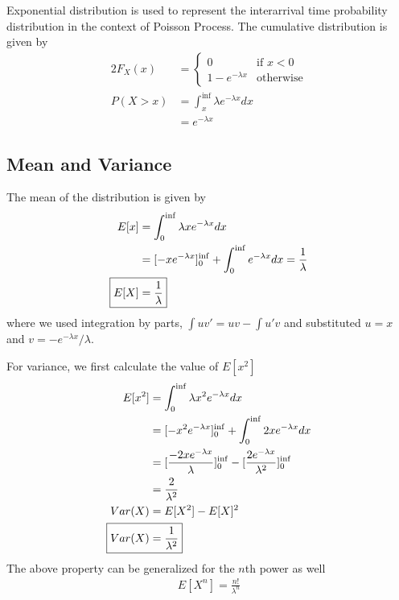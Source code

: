 \documentclass[11pt, a4paper]{article}
\begin{document}
    Exponential distribution is used to represent the interarrival time probability distribution in the context of Poisson Process. The cumulative distribution is given by
    \begin{alignat*}{2}
        F_{X}(x) &= \begin{cases} 0 &\mbox{if $x < 0$}\\
                                1 - e^{-\lambda x} &\mbox{otherwise} \end{cases}\\
        P(X > x) &= \int_{x}^{\inf} \lambda e^{-\lambda x} dx\\
        &= e^{-\lambda x}
    \end{alignat*}

    \subsection{Mean and Variance}
    The mean of the distribution is given by
    \begin{align*}
        E[x] &= \int_{0}^{\inf} \lambda x e^{-\lambda x} dx\\
        &= [-x e^{-\lambda x}]_{0}^{\inf} + \int_{0}^{\inf} e^{-\lambda x} dx = \frac{1}{\lambda}\\
        \Aboxed{E[X] &= \frac{1}{\lambda}}
    \end{align*}
    where we used integration by parts, $\int uv' = uv - \int u'v$ and substituted $u = x$ and $v = -e^{-\lambda x}/\lambda$.\newline

    For variance, we first calculate the value of $E[x^{2}]$
    \begin{align*}
        E[x^{2}] &= \int_{0}^{\inf} \lambda x^{2} e^{-\lambda x} dx\\
        &= [-x^{2} e^{-\lambda x}]_{0}^{\inf} + \int_{0}^{\inf} 2x e^{-\lambda x} dx\\
        &= [\frac{-2x e^{-\lambda x}}{\lambda}]_{0}^{\inf} - [\frac{2e^{-\lambda x}}{\lambda^{2}}]_{0}^{\inf}\\
        &= \frac{2}{\lambda^{2}}\\
        Var(X) &= E[X^{2}] - E[X]^{2}\\
        \Aboxed{Var(X) &= \frac{1}{\lambda^{2}}}
    \end{align*}
    The above property can be generalized for the $n$th power as well
    \begin{align*}
        E[X^{n}] = \frac{n!}{\lambda^{n}}
    \end{align*}
\end{document}
